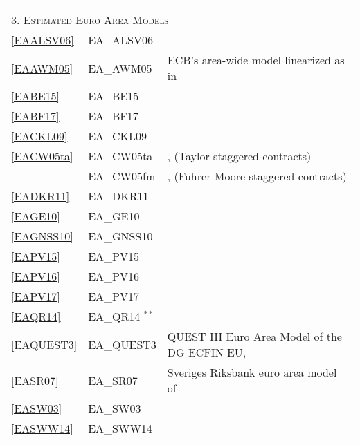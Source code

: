 \documentclass[11pt,a4paper]{article}
\begin{document}
\begin{table}[H]
\begin{tabularx}{\textwidth}{lll}
			&& \\
			\multicolumn{3}{l}{\textsc{3. Estimated Euro Area Models }} \\
			\ref{EAALSV06} & EA\_ALSV06 & \cite{andres2006lopezsalido} \\
			\ref{EAAWM05} & EA\_AWM05 &  ECB's area-wide model linearized as in \cite{DieppeKuesterMcAdam2005}\\
			\ref{EABE15} & EA\_BE15 & \cite{benchimol2015money} \\
			\ref{EABF17} & EA\_BF17 & \cite{benchimol2017money} \\
			\ref{EACKL09} & EA\_CKL09 & \cite{ChristoffelKuesterLinzert2009} \\
			\ref{EACW05ta} & EA\_CW05ta & \cite{CoenenWieland2005}, (Taylor-staggered contracts) \\
			& EA\_CW05fm & \cite{CoenenWieland2005}, (Fuhrer-Moore-staggered contracts) \\
			\ref{EADKR11} & EA\_DKR11 &  \cite{DarracqPariesetal2011} \\
			\ref{EAGE10} & EA\_GE10 & \cite{Gelain2010} \\
			\ref{EAGNSS10} & EA\_GNSS10 & \cite{Geralietal2010} \\
			\ref{EAPV15} & EA\_PV15 & \cite{poutineau2015cross} \\
			\ref{EAPV16} & EA\_PV16 & \cite{priftis2016portfolio} \\
			\ref{EAPV17} & EA\_PV17 & \cite{priftis2017macroecon} \\
			\ref{EAQR14} & EA\_QR14 $ ^{\ast \ast}$ & \cite{QR2014}  \\
			\ref{EAQUEST3} & EA\_QUEST3 & QUEST III Euro Area Model of the DG-ECFIN EU, \cite{RattoRoegerVeld2009} \\
			\ref{EASR07} & EA\_SR07 & Sveriges Riksbank euro area model of \cite{AdolfsonLaseenLindeVillani2007}\\
			\ref{EASW03} & EA\_SW03 & \cite{SmetsWouters2003} \\
			
			
			\ref{EASWW14} & EA\_SWW14 & \cite{smets2014warne} \\

			

\end{tabularx}
\end{table}
\end{document}
